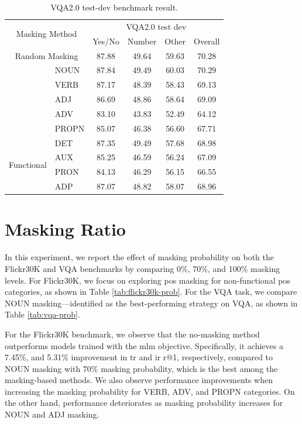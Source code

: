 \begin{table}[H]
    \centering
    \caption{VQA2.0 test-dev benchmark result.}
    \label{tab:vqa}
    \begin{adjustbox}{width=0.6\textwidth}
        \begin{tabular}{ll|cccc}
            \hline
            \multicolumn{2}{c|}{\multirow{2}{*}{Masking Method}} & \multicolumn{4}{c}{VQA2.0 test dev} \\
            & & Yes/No & Number & Other & Overall \\
            \hline
            \multicolumn{2}{c|}{Random Masking} & 87.88 & 49.64 & 59.63 & 70.28 \\
            \hline
            \rowcolor{gray}\multirow{5}{*}{Non-functional} & NOUN & 87.84 & 49.49 & 60.03 & 70.29 \\
            & VERB & 87.17 & 48.39 & 58.43 & 69.13 \\
            & ADJ & 86.69 & 48.86 & 58.64 & 69.09 \\
            & ADV & 83.10 & 43.83 & 52.49 & 64.12 \\
            & PROPN & 85.07 & 46.38 & 56.60 & 67.71 \\
            \hline
            \multirow{4}{*}{Functional} & DET & 87.35 & 49.49 & 57.68 & 68.98 \\
            & AUX & 85.25 & 46.59 & 56.24 & 67.09 \\
            & PRON & 84.13 & 46.29 & 56.15 & 66.55 \\
            & ADP & 87.07 & 48.82 & 58.07 & 68.96 \\
            \hline
        \end{tabular}
    \end{adjustbox}
\end{table}

\section{Masking Ratio}
In this experiment, we report the effect of masking probability on both the Flickr30K and VQA benchmarks by comparing 0\%, 70\%, and 100\% masking levels.
For Flickr30K, we focus on exploring \acrshort{pos} masking for non-functional \acrshort{pos} categories, as shown in Table \ref{tab:flickr30k-prob}.
For the VQA task, we compare NOUN masking—identified as the best-performing strategy on VQA, as shown in Table \ref{tab:vqa-prob}.

For the Flickr30K benchmark, we observe that the no-masking method outperforms models trained with the \acrshort{mlm} objective.
Specifically, it achieves a 7.45\%, and 5.31\% improvement in \acrshort{tr} and \acrshort{ir} r@1, respectively, compared to NOUN masking with 70\% masking probability, which is the best among the masking-based methods.
We also observe performance improvements when increasing the masking probability for VERB, ADV, and PROPN categories.
On the other hand, performance deteriorates as masking probability increases for NOUN and ADJ masking.

